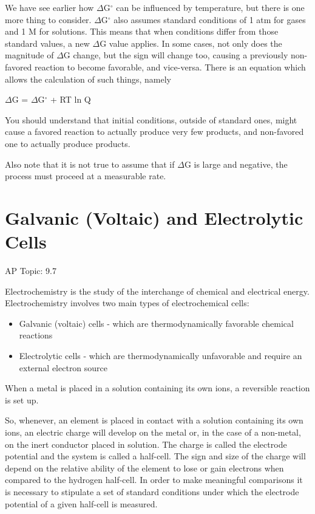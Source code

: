 \documentclass[../chem.tex]{subfiles}
\begin{document}
We have see earlier how $\Delta$G$^{\circ}$ can be influenced by temperature, but there is one more thing to consider. $\Delta$G$^{\circ}$ also assumes 
standard conditions of 1 atm for gases and 1 M for solutions. This means that when conditions differ from those standard values, a new $\Delta$G value applies.
In some cases, not only does the magnitude of $\Delta$G change, but the sign will change too, causing a previously non-favored reaction to become favorable, and vice-versa.
There is an equation which allows the calculation of such things, namely 
\begin{center}
    $\Delta$G = $\Delta$G$^{\circ}$ + RT ln Q 
\end{center}

You should understand that initial conditions, outside of standard ones, might cause a favored reaction to actually produce very few products, and non-favored one to actually produce products.

Also note that it is not true to assume that if $\Delta$G is large and negative, the process must proceed at a measurable rate.
\section{Galvanic (Voltaic) and Electrolytic Cells}
AP Topic: 9.7

Electrochemistry is the study of the interchange of chemical and electrical energy. Electrochemistry involves two main types of electrochemical cells:
\begin{itemize}
    \item Galvanic (voltaic) cells - which are thermodynamically favorable chemical reactions 
    \item Electrolytic cells - which are thermodynamically unfavorable and require an external electron source
\end{itemize}

When a metal is placed in a solution containing its own ions, a reversible reaction is set up. 

So, whenever, an element is placed in contact with a solution containing its own ions, an electric charge will develop on the metal or, 
in the case of a non-metal, on the inert conductor placed in solution. The charge is called the electrode potential and the system is called a half-cell.
The sign and size of the charge will depend on the relative ability of the element to lose or gain electrons when compared to the hydrogen half-cell.
In order to make meaningful comparisons it is necessary to stipulate a set of standard conditions under which the electrode potential of a given half-cell is measured.
\end{document}

